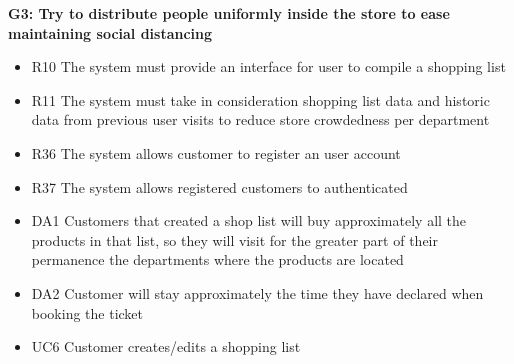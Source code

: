 \textbf{G3: Try to distribute people uniformly inside the store to ease maintaining social distancing}
\begin{itemize}[label=\textcolor{clup_blue2}{\textbullet}]
    \item R10 The system must provide an interface for user to compile a shopping list
    \item R11 The system must take in consideration shopping list data and historic data from previous user visits to reduce store crowdedness per department
    \item R36 The system allows customer to register an user account
    \item R37 The system allows registered customers to authenticated
\end{itemize}
\begin{itemize}[label=\textcolor{clup_red}{\textbullet}]
    \item DA1 Customers that created a shop list will buy approximately all the products in that list, so they will visit for the greater part of their permanence the departments where the products are located
    \item DA2 Customer will stay approximately the time they have declared when booking the ticket
\end{itemize}
\begin{itemize}[label=\textcolor{clup_yellow}{\textbullet}]
    \item UC6 Customer creates/edits a shopping list
\end{itemize}

\vfill
\pagebreak

